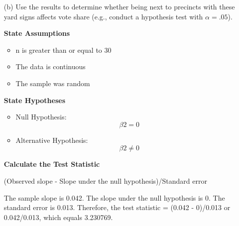 \documentclass[12pt,letterpaper]{article}
\begin{document}
\begin{enumerate}
	\begin{verbatim}
	[1] 27
	\end{verbatim}
	
	\noindent After finding the degrees of freedom, I calculated the p-value by using the pt function and inputting the values I found for the test statistic and the degrees of freedom. I set lower.tail equal to FALSE and multiplied the result by 2 because this is a two-tailed t-test. This is because we do not care if our slope is greater than or less than 0, we only care whether or not it is significantly different from 0.
	
	
	
	\begin{verbatim}
	[1] 0.01409096
	\end{verbatim}
	
	\noindent I got a p-value of 0.01409096, which is less than the critical value of 0.05. Therefore, we can reject the null hypothesis that Beta 1 (the slope for precincts assigned lawn signs) = 0
	
	\item [(b)]  Use the results to determine whether being
	next to precincts with these yard signs affects vote
	share (e.g., conduct a hypothesis test with $\alpha = .05$).
	
	\noindent \textbf{State Assumptions}
	
	\begin{itemize}
		\item n is greater than or equal to 30
		\item The data is continuous
		\item The sample was random
	\end{itemize}
	
	\noindent \textbf{State Hypotheses}
	\begin{itemize}
		\item Null Hypothesis: $$\beta2 = 0$$
		\item Alternative Hypothesis: $$\beta2 \neq 0$$
	\end{itemize}
	
	\noindent \textbf{Calculate the Test Statistic}
	
	\noindent (Observed slope - Slope under the null hypothesis)/Standard error
	
	\noindent The sample slope is 0.042. The slope under the null hypothesis is 0. The standard error is 0.013. Therefore, the test statistic = (0.042 - 0)/0.013 or 0.042/0.013, which equals 3.230769.
	

\end{enumerate}
\end{document}
